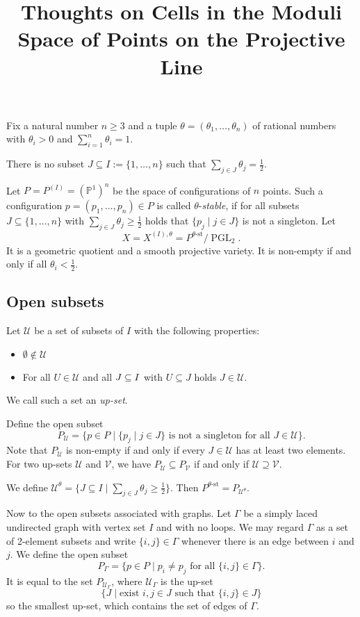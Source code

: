 \documentclass[11pt, a4paper]{amsart}
\title{Thoughts on Cells in the Moduli Space of Points on the Projective Line}
\author{}
\date{}
\begin{document}
\maketitle

Fix a natural number \(n \geq 3\) and a tuple \(\theta = (\theta_1,\ldots,\theta_n)\) of rational numbers with \(\theta_i > 0\) and \(\sum_{i=1}^n \theta_i = 1\). 

\begin{ass*}
	There is no subset \(J \subseteq I := \{1,\ldots,n\}\) such that \(\sum_{j \in J} \theta_j = \frac{1}{2}\).
\end{ass*}

Let \(P = P^{(I)} = {(\mathbb{P}^1)}^n\) be the space of configurations of \(n\) points. 
Such a configuration \(p = (p_1,\ldots,p_n) \in P\) is called \(\theta\)-\emph{stable}, if for all subsets \(J \subseteq \{1,\ldots,n\}\) with \(\sum_{j \in J} \theta_j \geq \frac{1}{2}\) holds that \(\{p_j \mid j \in J\}\) is not a singleton.
Let 
\[
	X = X^{(I),\theta} = P^{\theta\text{-st}}/\operatorname{PGL}_2.
\] 
It is a geometric quotient and a smooth projective variety. 
It is non-empty if and only if all \(\theta_i < \frac{1}{2}\).

\subsection*{Open subsets}
Let \(\mathcal{U}\) be a set of subsets of \(I\) with the following properties:
\begin{itemize}
	\item \(\emptyset \notin \mathcal{U}\)
	\item For all \(U \in \mathcal{U}\) and all \(J \subseteq I\) with \(U \subseteq J\) holds \(J \in \mathcal{U}\).
\end{itemize}
We call such a set an \emph{up-set}.

Define the open subset 
\[ 
	P_\mathcal{U} = \{p \in P \mid \{p_j \mid j \in J\} \text{ is not a singleton for all } J \in \mathcal{U} \}.
\]
Note that \(P_{\mathcal{U}}\) is non-empty if and only if every \(J \in \mathcal{U}\) has at least two elements. 
For two up-sets \(\mathcal{U}\) and \(\mathcal{V}\), we have \(P_{\mathcal{U}} \subseteq P_{\mathcal{V}}\) if and only if \(\mathcal{U} \supseteq \mathcal{V}\).

We define \(\mathcal{U}^\theta = \{J \subseteq I \mid \sum_{j \in J} \theta_j \geq \frac{1}{2} \}\). 
Then \(P^{\theta\text{-st}} = P_{\mathcal{U}^\theta}\).

Now to the open subsets associated with graphs. Let \(\Gamma\) be a simply laced undirected graph with vertex set \(I\) and with no loops.
We may regard \(\Gamma\) as a set of 2-element subsets and write \(\{i,j\} \in \Gamma\) whenever there is an edge between \(i\) and \(j\). 
We define the open subset 
\[
	P_\Gamma = \{p \in P \mid p_i \neq p_j \text{ for all } \{i,j\} \in \Gamma \}.
\]
It is equal to the set \(P_{\mathcal{U}_\Gamma}\), where \(\mathcal{U}_\Gamma\) is the up-set 
\[
	\{J \mid \text{exist } i,j \in J \text{ such that } \{i,j\} \in J\}
\]
so the smallest up-set, which contains the set of edges of \(\Gamma\).
\end{document}
